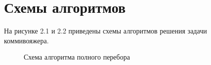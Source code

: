 \documentclass[12pt]{report}
\begin{document}
\section{Схемы алгоритмов}
На рисунке 2.1 и 2.2 приведены схемы алгоритмов решения задачи коммивояжера.\\
\par
\begin{figure}[h]
	\caption{Схема алгоритма полного перебора}
	\label{fig:f_p}
\end{figure}
\par
\end{document}
